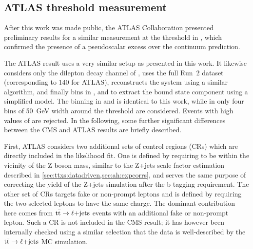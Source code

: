 \subsection{ATLAS \ttbartitle threshold measurement}

After this work was made public, the ATLAS Collaboration presented preliminary results for a similar measurement at the \ttbar threshold in , which confirmed the presence of a pseudoscalar excess over the \ttbar continuum prediction.

The ATLAS result uses a very similar setup as presented in this work. It likewise considers only the dilepton decay channel of \ttbar, uses the full Run~2 dataset (corresponding to \SI{140}{\fbinv} for ATLAS), reconstructs the \ttbar system using a similar algorithm, and finally bins in \mtt, \chel and \chan to extract the \ttbar bound state component using a simplified model. 
The binning in \chel and \chan is identical to this work, while in \mtt only four bins of \SI{50}{\GeV} width around the \ttbar threshold are considered. Events with high values of \mtt are rejected.
In the following, some further significant differences between the CMS and ATLAS results are briefly described.

First, ATLAS considers two additional sets of control regions (CRs) which are directly included in the likelihood fit. One is defined by requiring \mll to be within the vicinity of the Z boson mass, similar to the Z+jets scale factor estimation described in \cref{sec:ttxs:datadriven,sec:ah:expcorrs}, and serves the same purpose of correcting the yield of the Z+jets simulation after the b tagging requirement. The other set of CRs targets fake or non-prompt leptons and is defined by requiring the two selected leptons to have the same charge. The dominant contribution here comes from $\mathrm{t \bar{t}} \rightarrow \ell\mathrm{+jets}$ events with an additional fake or non-prompt lepton. Such a CR is not included in the CMS result; it has however been internally checked using a similar selection that the data is well-described by the $\mathrm{t \bar{t}} \rightarrow \ell\mathrm{+jets}$ MC simulation. 

